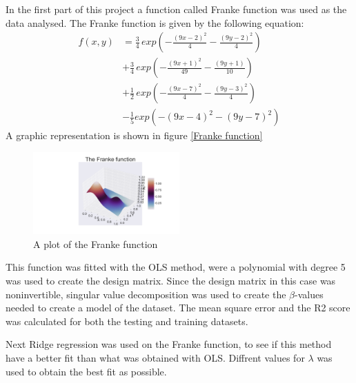\thispagestyle{plain}

\noindent In the first part of this project a function called Franke function was used as the data analysed. The Franke function is given by the following equation:
\begin{align*}
    f(x,y) &= \frac{3}{4} \, exp\left(- \frac{(9x-2)^2}{4} - \frac{(9y-2)^2}{4}\right) \\
    &+ \frac{3}{4}\, exp\left( - \frac{(9x +1)^2}{49} - \frac{(9y+1)}{10}\right) \\
    &+ \frac{1}{2}\, exp\left( -\frac{(9x-7)^2}{4} - \frac{(9y-3)^2}{4}\right) \\
    &- \frac{1}{5} exp \left( - (9x -4)^2 - (9y-7)^2\right)
\end{align*}
A graphic representation is shown in figure \eqref{Franke function}
\begin{figure}[H]
	\centering
	\includegraphics[width=0.5\textwidth]{Figure_1.png}
	\caption{\centering A plot of the Franke function }
	\label{Franke function}
\end{figure}
\noindent This function was fitted with the OLS method, were a polynomial with degree 5 was used to create the design matrix. Since the design matrix in this case was noninvertible, singular value decomposition was used to create the $\beta$-values needed to create a model of the dataset. The mean square error and the R2 score was calculated for both the testing and training datasets. \newline \newline

\noindent Next Ridge regression was used on the Franke function, to see if this method have a better fit than what was obtained with OLS. Diffrent values for $\lambda$ was used to obtain the best fit as possible.
